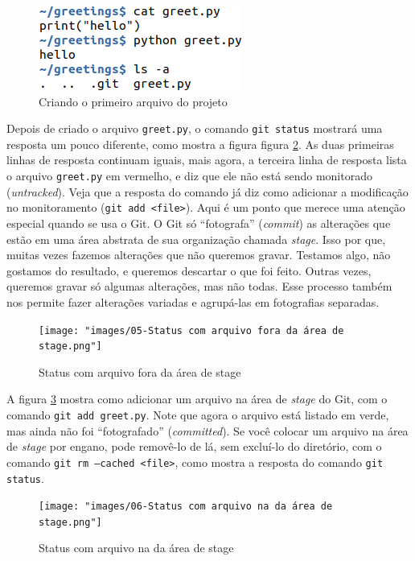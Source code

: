 \documentclass[a4paper]{book}
\begin{document}
\begin{figure}[ht]
\caption{Criando o primeiro arquivo do projeto}
\label{fig:04}
\centering
\includegraphics[scale=0.6,left]{"images/04-Criando o primeiro arquivo do projeto.png"}
\end{figure}

Depois de criado o arquivo \texttt{greet.py}, o comando
\texttt{git status} mostrará uma resposta um pouco diferente,
como mostra a figura figura \ref{fig:05}.
As duas primeiras linhas de resposta continuam iguais,
mais agora, a terceira linha de resposta lista o arquivo
\texttt{greet.py} em vermelho, e diz que ele não está
sendo monitorado (\textit{untracked}).
Veja que a resposta do comando já diz como adicionar
a modificação no monitoramento (\texttt{git add <file>}).
Aqui é um ponto que merece uma atenção especial quando se usa o Git.
O Git só ``fotografa'' (\textit{commit}) as alterações que estão
em uma área abstrata de sua organização chamada \textit{stage}.
Isso por que, muitas vezes fazemos alterações que não queremos 
gravar. Testamos algo, não gostamos do resultado, e queremos descartar
o que foi feito. Outras vezes, queremos gravar só algumas alterações,
mas não todas. 
Esse processo também nos permite fazer alterações variadas e 
agrupá-las em fotografias separadas.

\begin{figure}[ht]
\caption{Status com arquivo fora da área de stage}
\label{fig:05}
\centering
\texttt{[image: "images/05-Status com arquivo fora da área de stage.png"]}
\end{figure}

A figura \ref{fig:06} mostra como adicionar um arquivo na área de 
\textit{stage} do Git, com o comando \texttt{git add greet.py}.
Note que agora o arquivo está listado em verde, mas ainda não foi
``fotografado'' (\textit{committed}).
Se você colocar um arquivo na área de \textit{stage} por engano,
pode removê-lo de lá, sem excluí-lo do diretório, com o 
comando \texttt{git rm --cached <file>}, como mostra a resposta 
do comando \texttt{git status}.

\begin{figure}[ht]
\caption{Status com arquivo na da área de stage}
\label{fig:06}
\centering
\texttt{[image: "images/06-Status com arquivo na da área de stage.png"]}
\end{figure}
\end{document}
